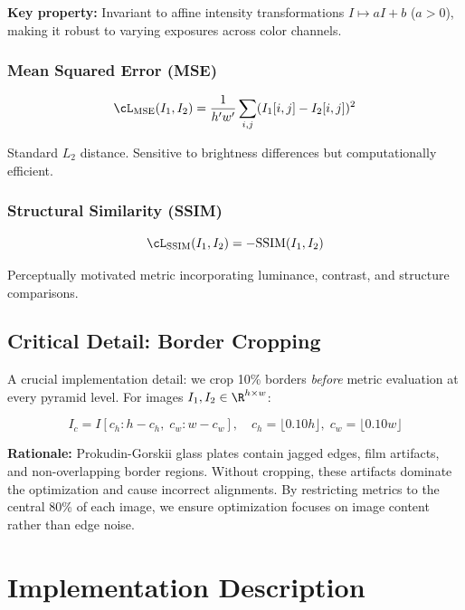 {\textbf{Key property:} Invariant to affine intensity transformations $I \mapsto aI + b$ ($a > 0$), making it robust to varying exposures across color channels.

\subsubsection{Mean Squared Error (MSE)}

\begin{equation}
\cL_{\text{MSE}}(I_1, I_2) = \frac{1}{h'w'}\sum_{i,j} (I_1[i,j] - I_2[i,j])^2
\end{equation}

Standard $L_2$ distance. Sensitive to brightness differences but computationally efficient.

\subsubsection{Structural Similarity (SSIM)}

\begin{equation}
\cL_{\text{SSIM}}(I_1, I_2) = -\text{SSIM}(I_1, I_2)
\end{equation}

Perceptually motivated metric incorporating luminance, contrast, and structure comparisons.

\subsection{Critical Detail: Border Cropping}

A crucial implementation detail: we crop 10\% borders \emph{before} metric evaluation at every pyramid level. For images $I_1, I_2 \in \R^{h \times w}$:

\begin{equation}
I_c = I[c_h : h-c_h, \; c_w : w-c_w], \quad c_h = \lfloor 0.10 h \rfloor, \; c_w = \lfloor 0.10 w \rfloor
\end{equation}

\textbf{Rationale:} Prokudin-Gorskii glass plates contain jagged edges, film artifacts, and non-overlapping border regions. Without cropping, these artifacts dominate the optimization and cause incorrect alignments. By restricting metrics to the central 80\% of each image, we ensure optimization focuses on image content rather than edge noise.

\section{Implementation Description}

}
